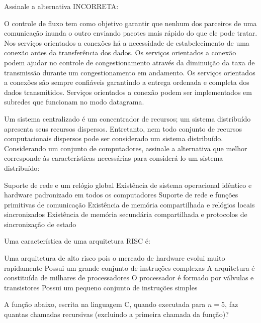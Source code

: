 \documentclass[12pt, addpoints]{exam}
\begin{document}
\begin{questions}
\question

Assinale a alternativa INCORRETA:


\begin{choices}
\choice O controle de fluxo tem como objetivo garantir que nenhum dos parceiros de uma comunicação inunda o outro enviando pacotes mais rápido do que ele pode tratar.
\choice Nos serviços orientados a conexões há a necessidade de estabelecimento de uma conexão antes da transferência dos dados.
\choice Os serviços orientados a conexão podem ajudar no controle de congestionamento através da diminuição da taxa de transmissão durante um congestionamento em andamento.
\choice Os serviços orientados a conexões são sempre confiáveis garantindo a entrega ordenada e completa dos dados transmitidos.
\choice Serviços orientados a conexão podem ser implementados em subredes que funcionam no modo datagrama.
\end{choices}

\question

Um sistema centralizado é um concentrador de recursos; um sistema distribuído apresenta seus recursos dispersos. Entretanto, nem todo conjunto de recursos computacionais dispersos pode ser considerado um sistema distribuído. Considerando um conjunto de computadores, assinale a alternativa que melhor corresponde às características necessárias para considerá-lo um sistema distribuído:
\begin{choices}
\choice Suporte de rede e um relógio global
\choice Existência de sistema operacional idêntico e hardware padronizado em todos os computadores
\choice Suporte de rede e funções primitivas de comunicação 
\choice Existência de memória compartilhada e relógios locais sincronizados 
\choice Existência de memória secundária compartilhada e protocolos de sincronização de estado
\end{choices}

\question

Uma característica de uma arquitetura RISC é:
\begin{choices}
\choice Uma arquitetura de alto risco pois o mercado de hardware evolui muito rapidamente
\choice Possui um grande conjunto de instruções complexas
\choice A arquitetura é constituída de milhares de processadores
\choice O processador é formado por válvulas e transistores
\choice Possui um pequeno conjunto de instruções simples
\end{choices}

\question

A função abaixo, escrita na linguagem C, quando executada para \( n = 5 \), faz quantas chamadas recursivas (excluindo a primeira chamada da função)? 


\end{questions}
\end{document}
